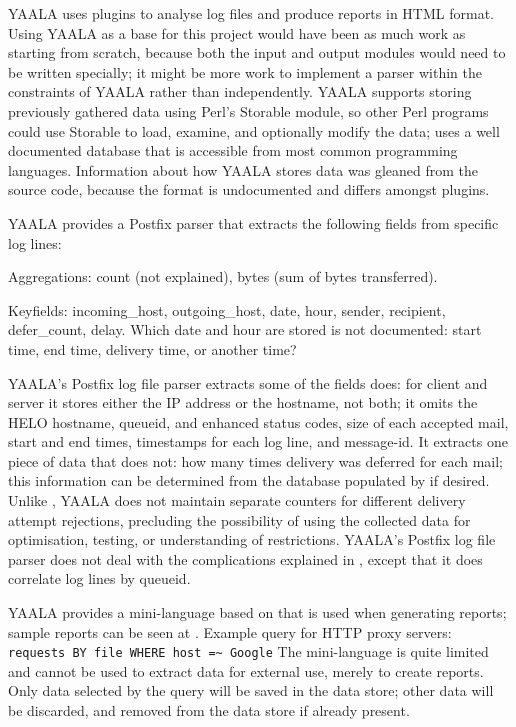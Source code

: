 YAALA uses plugins to analyse log files and produce reports in HTML format.
Using YAALA as a base for this project would have been as much work as
starting from scratch, because both the input and output modules would need
to be written specially; it might be more work to implement a parser within
the constraints of YAALA rather than independently.  YAALA supports storing
previously gathered data using Perl's Storable module, so other Perl
programs could use Storable to load, examine, and optionally modify the
data; \parsername{} uses a well documented database that is accessible from
most common programming languages.  Information about how YAALA stores data
was gleaned from the source code, because the format is undocumented and
differs amongst plugins.

YAALA provides a Postfix parser that extracts the following fields from
specific log lines:

\begin{boldeqlist}

    \item [Aggregations:] count (not explained), bytes (sum of bytes
        transferred).

    \item [Keyfields:] incoming\_host, outgoing\_host, date, hour, sender,
        recipient, defer\_count, delay.  Which date and hour are stored is
        not documented: start time, end time, delivery time, or another
        time?

\end{boldeqlist}

YAALA's Postfix log file parser extracts some of the fields \parsername{}
does: for client and server it stores either the IP address or the
hostname, not both; it omits the HELO hostname, queueid,  and
enhanced status codes, size of each accepted mail, start and end times,
timestamps for each log line, and message-id\@.  It extracts one piece of
data that \parsername{} does not: how many times delivery was deferred for
each mail; this information can be determined from the database populated
by \parsername{} if desired.  Unlike \parsername{}, YAALA does not maintain
separate counters for different delivery attempt rejections, precluding the
possibility of using the collected data for optimisation, testing, or
understanding of restrictions.  YAALA's Postfix log file parser does not
deal with the complications explained in , except
that it does correlate log lines by queueid.

YAALA provides a mini-language based on  that is used when
generating reports; sample reports can be seen at
.  Example
query for HTTP proxy servers: \newline{} \tab{} \texttt{requests BY file
WHERE host =\~{} Google} \newline{} The mini-language is quite limited and
cannot be used to extract data for external use, merely to create reports.
Only data selected by the query will be saved in the data store; other data
will be discarded, and removed from the data store if already present.


